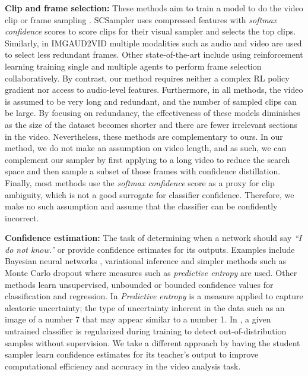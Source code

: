\documentclass[a4paper,conference]{IEEEtran}
\begin{document}
{\bf Clip and frame selection:} These methods aim to train a model to do the video clip or frame sampling \cite{alwassel2018action, korbar2019scsampler, su2016leaving, wu2019multi, wu2019adaframe, yeung2016end, gao2020listen}. SCSampler \cite{korbar2019scsampler} uses compressed features with \textit{softmax confidence} scores to score clips for their visual sampler and selects the top  clips. Similarly, in IMGAUD2VID \cite{gao2020listen} multiple modalities such as audio and video are used to select less redundant frames. Other state-of-the-art include using reinforcement learning \cite{wu2019adaframe} training single and \cite{wu2019multi} multiple agents to perform frame selection collaboratively. By contrast, our method requires neither a complex RL policy gradient nor access to audio-level features.
Furthermore, in all methods, the video is assumed to be very long and redundant, and the number of sampled clips can be large. By focusing on redundancy, the effectiveness of these models diminishes as the size of the dataset becomes shorter and there are fewer irrelevant sections in the video. Nevertheless, these methods are complementary to ours. In our method, we do not make an assumption on video length, and as such, we can complement our sampler by first applying \cite{gao2020listen, korbar2019scsampler, wu2019adaframe} to a long video to reduce the search space and then sample a subset of those frames with confidence distillation. Finally, most methods use the \textit{softmax confidence} score as a proxy for clip ambiguity, which is not a good surrogate for classifier confidence. Therefore, we make no such assumption and assume that the classifier can be confidently incorrect. 

{\bf Confidence estimation:} The task of determining when a network should say \textit{\enquote{I do not know.}} or provide confidence estimates for its outputs. Examples include Bayesian neural networks \cite{mackay1992bayesian}, variational inference \cite{blundell2015weight, farquhar2020radial} and simpler methods such as Monte Carlo dropout \cite{gal2016uncertainty} where measures such as \textit{predictive entropy} are used. Other methods learn unsupervised, unbounded \cite{kendall2017uncertainties} or bounded confidence values \cite{devries2018learning} for classification and regression. In \cite{gal2016uncertainty, hein2019relu} \textit{Predictive entropy} is a measure applied to capture aleatoric uncertainty; the type of uncertainty inherent in the data such as an image of a number 7 that may appear similar to a number 1. In \cite{devries2018learning}, a given untrained classifier is regularized during training to detect out-of-distribution samples without supervision. We take a different approach by having the student sampler learn confidence estimates for its teacher's output to improve computational efficiency and accuracy in the video analysis task.
\end{document}
